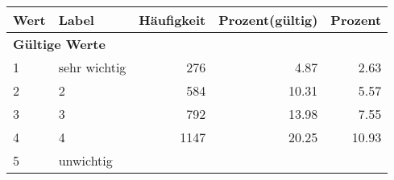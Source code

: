      \begin{longtable}{lXrrr}
     \toprule
     \textbf{Wert} & \textbf{Label} & \textbf{Häufigkeit} & \textbf{Prozent(gültig)} & \textbf{Prozent} \\
     \endhead
     \midrule
     \multicolumn{5}{l}{\textbf{Gültige Werte}}\\

     1 &
     \multicolumn{1}{X}{ sehr wichtig   } &


       \num{276} &
       \num[round-mode=places,round-precision=2]{4,87} &
         \num[round-mode=places,round-precision=2]{2,63} \\

     2 &
     \multicolumn{1}{X}{ 2   } &


       \num{584} &
       \num[round-mode=places,round-precision=2]{10,31} &
         \num[round-mode=places,round-precision=2]{5,57} \\

     3 &
     \multicolumn{1}{X}{ 3   } &


       \num{792} &
       \num[round-mode=places,round-precision=2]{13,98} &
         \num[round-mode=places,round-precision=2]{7,55} \\

     4 &
     \multicolumn{1}{X}{ 4   } &


       \num{1147} &
       \num[round-mode=places,round-precision=2]{20,25} &
         \num[round-mode=places,round-precision=2]{10,93} \\

     5 &
     \multicolumn{1}{X}{ unwichtig   } &



\end{longtable}
